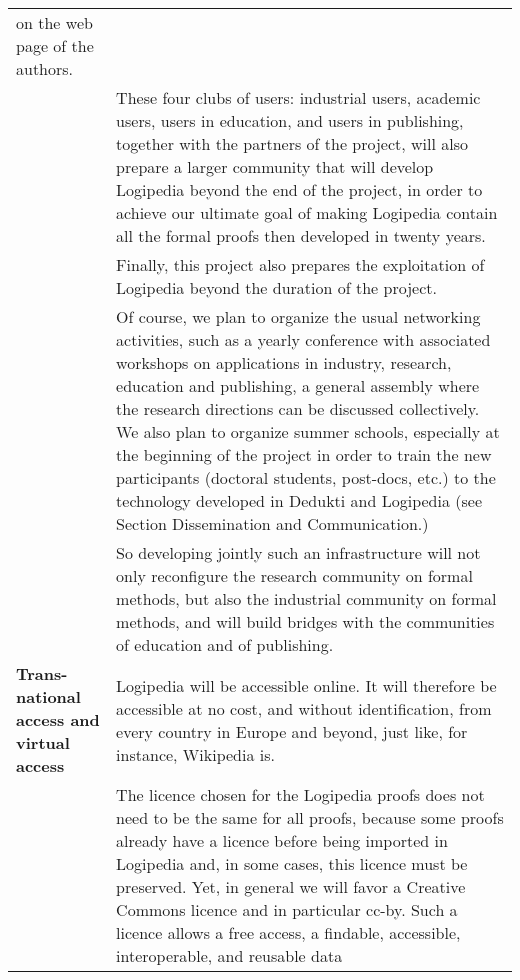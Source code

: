 \begin{longtable*}{|p{0.2\textwidth}|p{0.75\textwidth}|}
on the web page of the authors.\\
&
\hspace{0.4cm}
These four clubs of users: industrial users, academic users, users in 
education, and users in publishing, together with the partners of the 
project, will also
prepare a larger community that will develop Logipedia beyond the end
of the project, in order to achieve our ultimate goal of making
Logipedia contain all the formal proofs then developed in twenty
years.\\
&
\hspace{0.4cm}
Finally, this project also prepares the exploitation of Logipedia
beyond the duration of the project.\\
&
\hspace{0.4cm}
Of course, we plan to organize the usual networking activities,
such as a yearly conference with associated workshops on applications
in industry, research, education and publishing, a general assembly
where the research directions can be discussed collectively. We also plan to organize
summer schools, especially at the beginning of the project in order to
train the new participants (doctoral students, post-docs, etc.) to the
technology developed in Dedukti and Logipedia
(see Section Dissemination and Communication.)\\
&
\hspace{0.4cm}
So developing jointly such an infrastructure will not only reconfigure
the research community on formal methods, but also the industrial
community on formal methods, and will build bridges with the communities
of education and of publishing.\\
\hline
{\bf Trans-national access and virtual access}
&
Logipedia will be accessible online. It will therefore be accessible
at no cost, and without identification, from every country in Europe
and beyond, just like, for instance, Wikipedia is.\\
&
\hspace{0.4cm} The licence chosen for the Logipedia proofs does not
need to be the same for all proofs, because some proofs already have a
licence before being imported in Logipedia and, in some cases, this
licence must be preserved.  Yet, in general we will favor a Creative
Commons licence and in particular cc-by.  Such a licence allows a free
access, a findable, accessible, interoperable, and reusable data

\end{longtable*}
